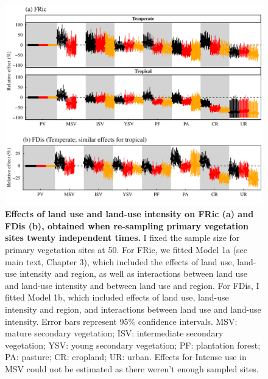 \begin{figure}[h!]
\centering
\includegraphics[scale=0.7]{Supporting/Chapter3/Figures/Figure_SI_21}
\caption[Effects of land use and land-use intensity on FRic (a) and FDis (b), obtained when re-sampling primary vegetation sites twenty independent times]{\textbf{Effects of land use and land-use intensity on FRic (a) and FDis (b), obtained when re-sampling primary vegetation sites twenty independent times.} I fixed the sample size for primary vegetation sites at 50. For FRic, we fitted Model 1a (see main text, Chapter 3), which included the effects of land use, land-use intensity and region, as well as interactions between land use and land-use intensity and between land use and region. For FDis, I fitted Model 1b, which included effects of land use, land-use intensity and region, and interactions between land use and land-use intensity. Error bars represent 95\% confidence intervals. MSV: mature secondary vegetation; ISV: intermediate secondary vegetation; YSV: young secondary vegetation; PF: plantation forest; PA: pasture; CR: cropland; UR: urban. Effects for Intense use in MSV could not be estimated as there weren’t enough sampled sites.}
\label{SI3_F21}
\end{figure}



